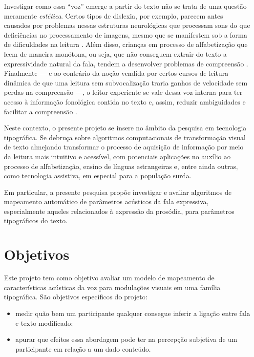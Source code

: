 \documentclass[a4paper,11pt,titlepage,singlespacing]{article}
\begin{document}
Investigar como essa ``voz'' emerge a partir do texto não se trata de uma questão meramente \textit{estética}. Certos tipos de dislexia, por exemplo, parecem antes causados por problemas nessas estruturas neurológicas que processam sons do que deficiências no processamento de imagens, mesmo que se manifestem sob a forma de dificuldades na  leitura \cite[cap.8]{seidenberg2017}. Além disso, crianças em processo de alfabetização que leem de maneira monótona, ou seja, que não conseguem extrair do texto a expressividade natural da fala, tendem a desenvolver problemas de compreensão \cite{bessemans2017}. Finalmente — e ao contrário da noção vendida por certos cursos de leitura dinâmica de que uma leitura sem subvocalização traria ganhos de velocidade sem perdas na compreensão —, o leitor experiente se vale dessa voz interna para ter acesso à informação fonológica contida no texto e, assim, reduzir ambiguidades e facilitar a compreensão \cite[cap.4]{seidenberg2017}.

Neste contexto, o presente projeto se insere no âmbito da pesquisa em tecnologia tipográfica. Se debruça sobre algoritmos computacionais de transformação visual de texto almejando transformar o processo de aquisição de informação por meio da leitura mais intuitivo e acessível, com potenciais aplicações no auxílio ao processo de alfabetização, ensino de línguas estrangeiras e, entre ainda outras, como tecnologia assistiva, em especial para a população surda.

Em particular, a presente pesquisa propõe investigar e avaliar algoritmos de mapeamento automático de parâmetros acústicos da fala expressiva, especialmente aqueles relacionados à expressão da prosódia, para parâmetros tipográficos do texto.



\section{Objetivos}

\noindent Este projeto tem como objetivo avaliar um modelo de mapeamento de características acústicas da voz para modulações visuais em uma família tipográfica. 
São objetivos específicos do projeto:
\begin{itemize}
    \item medir quão bem um participante qualquer consegue inferir a ligação entre fala e texto modificado;
    \item apurar que efeitos essa abordagem pode ter na percepção subjetiva de um participante em relação a um dado conteúdo.
\end{itemize} 
\end{document}
